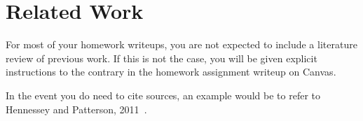 
\section{Related Work}

For most of your homework writeups, you are not expected to include a literature review of previous work. If this is not the case, you will be given explicit instructions to the contrary in the homework assignment writeup on Canvas.

In the event you do need to cite sources, an example would be to refer to Hennessey and Patterson, 2011~\cite{HennessyPatterson:CompArch5thEd:2011}.

